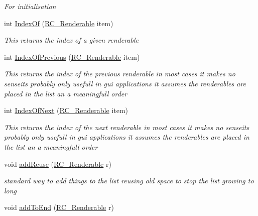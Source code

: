 \begin{DoxyCompactItemize}
\begin{DoxyCompactList}\small\item\em For initialisation \end{DoxyCompactList}\item 
int \mbox{\hyperlink{class_r_c___framework_1_1_r_c___renderable_list_acc544e521274aaf092219cd33b59cf86}{Index\+Of}} (\mbox{\hyperlink{class_r_c___framework_1_1_r_c___renderable}{R\+C\+\_\+\+Renderable}} item)
\begin{DoxyCompactList}\small\item\em This returns the index of a given renderable \end{DoxyCompactList}\item 
int \mbox{\hyperlink{class_r_c___framework_1_1_r_c___renderable_list_aa18cdc63b500d558e79c9a73ae668b30}{Index\+Of\+Previous}} (\mbox{\hyperlink{class_r_c___framework_1_1_r_c___renderable}{R\+C\+\_\+\+Renderable}} item)
\begin{DoxyCompactList}\small\item\em This returns the index of the previous renderable in most cases it makes no senseits probably only usefull in gui applications it assumes the renderables are placed in the list an a meaningfull order \end{DoxyCompactList}\item 
int \mbox{\hyperlink{class_r_c___framework_1_1_r_c___renderable_list_a8871117c0fd0d66d14f3b3049e3c7712}{Index\+Of\+Next}} (\mbox{\hyperlink{class_r_c___framework_1_1_r_c___renderable}{R\+C\+\_\+\+Renderable}} item)
\begin{DoxyCompactList}\small\item\em This returns the index of the next renderable in most cases it makes no senseits probably only usefull in gui applications it assumes the renderables are placed in the list an a meaningfull order \end{DoxyCompactList}\item 
void \mbox{\hyperlink{class_r_c___framework_1_1_r_c___renderable_list_aa03dda23b963f5392732f0ee59cfc388}{add\+Reuse}} (\mbox{\hyperlink{class_r_c___framework_1_1_r_c___renderable}{R\+C\+\_\+\+Renderable}} r)
\begin{DoxyCompactList}\small\item\em standard way to add things to the list reusing old space to stop the list growing to long \end{DoxyCompactList}\item 
void \mbox{\hyperlink{class_r_c___framework_1_1_r_c___renderable_list_a9b760ae083aa63818a0789ba10d0af40}{add\+To\+End}} (\mbox{\hyperlink{class_r_c___framework_1_1_r_c___renderable}{R\+C\+\_\+\+Renderable}} r)

\end{DoxyCompactItemize}
